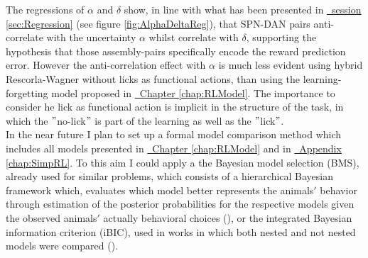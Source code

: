 The regressions of $\alpha$ and $\delta$ show, in line with what has been presented in \hyperref[sec:Regression]{~session \ref*{sec:Regression}} (see figure \ref{fig:AlphaDeltaReg}), that SPN-DAN pairs anti-correlate with the uncertainty $\alpha$ whilst correlate with $\delta$, supporting the hypothesis that those assembly-pairs specifically encode the reward prediction error. However the anti-correlation effect with $\alpha$ is much less evident using hybrid Rescorla-Wagner without licks as functional actions, than using the learning-forgetting model proposed in \hyperref[chap:RLModel]{~Chapter \ref*{chap:RLModel}}. The importance to consider he lick as functional action is implicit in the structure of the task, in which the $"$no-lick$"$ is part of the learning as well as the $"$lick$"$.\\In the near future I plan to set up a formal model comparison method which includes all models presented in \hyperref[chap:RLModel]{~Chapter \ref*{chap:RLModel}} and in \hyperref[chap:SimpRL]{~Appendix \ref*{chap:SimpRL}}. To this aim I could apply a the Bayesian model selection (BMS), already used for similar problems, which consists of a hierarchical Bayesian framework which, evaluates which model better represents the animals$'$ behavior through estimation of the posterior probabilities for the respective models given the observed animals$'$ actually behavioral choices (\cite{Koppe}), or the integrated Bayesian information criterion (iBIC), used in works in which both nested and not nested models were compared (\cite{Dayan}).